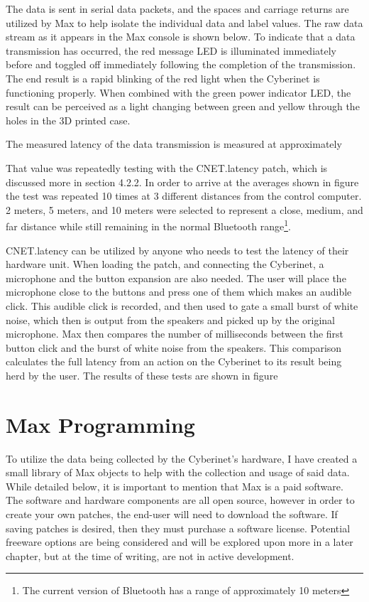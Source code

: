 The data is sent in serial data packets, and the spaces and carriage returns are utilized by Max to help isolate the individual data and label values. The raw data stream as it appears in the Max console is shown below. To indicate that a data transmission has occurred, the red message LED is illuminated immediately before and toggled off immediately following the completion of the transmission. The end result is a rapid blinking of the red light when the Cyberinet is functioning properly. When combined with the green power indicator LED, the result can be perceived as a light changing between green and yellow through the holes in the 3D printed case.


The measured latency of the data transmission is measured at approximately %

That value was repeatedly testing with the CNET.latency patch, which is discussed more in section 4.2.2. In order to arrive at the averages shown in figure %
the test was repeated 10 times at 3 different distances from the control computer. 2 meters, 5 meters, and 10 meters were selected to represent a close, medium, and far distance while still remaining in the normal Bluetooth range\footnote{The current version of Bluetooth has a range of approximately 10 meters}.

CNET.latency can be utilized by anyone who needs to test the latency of their hardware unit. When loading the patch, and connecting the Cyberinet, a microphone and the button expansion are also needed. The user will place the microphone close to the buttons and press one of them which makes an audible click. This audible click is recorded, and then used to gate a small burst of white noise, which then is output from the speakers and picked up by the original microphone. Max then compares the number of milliseconds between the first button click and the burst of white noise from the speakers. This comparison calculates the full latency from an action on the Cyberinet to its result being herd by the user. The results of these tests are shown in figure  

\section{Max Programming}

To utilize the data being collected by the Cyberinet’s hardware, I have created a small library of Max objects to help with the collection and usage of said data. While detailed below, it is important to mention that Max is a paid software. The software and hardware components are all open source, however in order to create your own patches, the end-user will need to download the software. If saving patches is desired, then they must purchase a software license. Potential freeware options are being considered and will be explored upon more in a later chapter, but at the time of writing, are not in active development.

